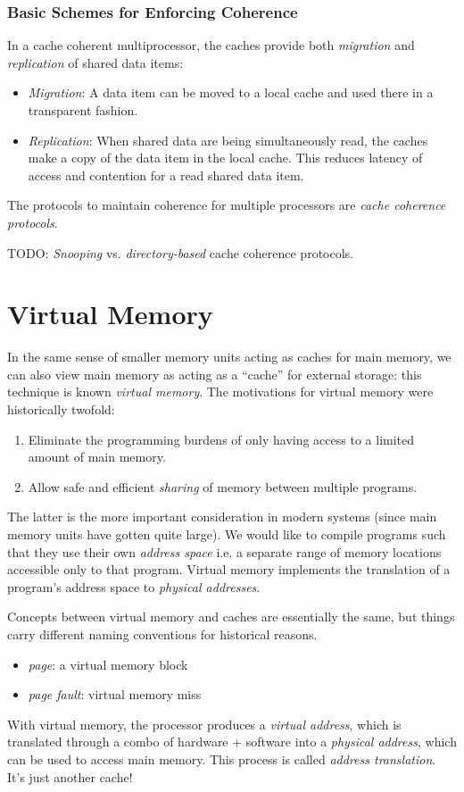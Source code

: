 \documentclass[10pt,a4paper]{article}
\begin{document}
\subsubsection*{Basic Schemes for Enforcing Coherence}

In a cache coherent multiprocessor, the caches provide both \textit{migration} and \textit{replication} of shared data items:
\begin{itemize}
    \item \textit{Migration}: A data item can be moved to a local cache and used there in a transparent fashion.
    \item \textit{Replication}: When shared data are being simultaneously read, the caches make a copy of the data item in the local cache. This reduces latency of access and contention for a read shared data item.
\end{itemize}
The protocols to maintain coherence for multiple processors are \textit{cache coherence protocols}.

TODO: \textit{Snooping} vs. \textit{directory-based} cache coherence protocols.

\section{Virtual Memory}

In the same sense of smaller memory units acting as caches for main memory, we can also view main memory as acting as a ``cache'' for external storage: this technique is known \textit{virtual memory}. The motivations for virtual memory were historically twofold: 
\begin{enumerate}
    \item Eliminate the programming burdens of only having access to a limited amount of main memory.
    \item Allow safe and efficient \textit{sharing} of memory between multiple programs.
\end{enumerate}
The latter is the more important consideration in modern systems (since main memory units have gotten quite large). We would like to compile programs such that they use their own \textit{address space} i.e. a separate range of memory locations accessible only to that program. Virtual memory implements the translation of a program's address space to \textit{physical addresses}.

Concepts between virtual memory and caches are essentially the same, but things carry different naming conventions for historical reasons. 
\begin{itemize}
    \item \textit{page}: a virtual memory block
    \item \textit{page fault}: virtual memory miss
\end{itemize}
With virtual memory, the processor produces a \textit{virtual address}, which is translated through a combo of hardware + software into a \textit{physical address}, which can be used to access main memory. This process is called \textit{address translation}. It's just another cache!
\end{document}
